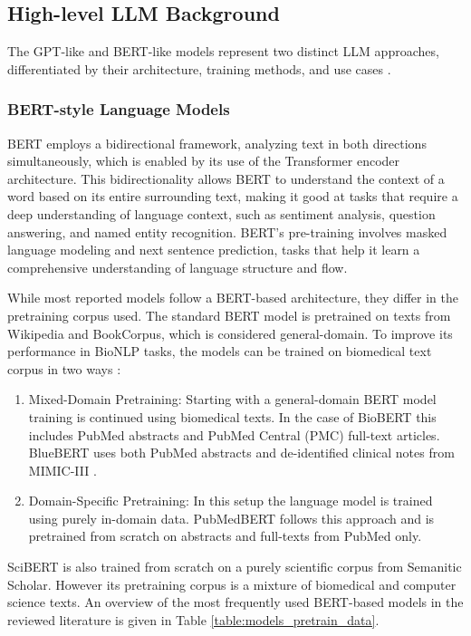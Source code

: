 \documentclass[fleqn,10pt]{olplainarticle}
\begin{document}
\subsection*{High-level LLM Background}
The GPT-like and BERT-like models represent two distinct LLM approaches, differentiated by their architecture, training methods, and use cases \citep{yang2023harnessing}. 

\subsubsection*{BERT-style Language Models}
BERT employs a bidirectional framework, analyzing text in both directions simultaneously, which is enabled by its use of the Transformer encoder architecture. This bidirectionality allows BERT to understand the context of a word based on its entire surrounding text, making it good at tasks that require a deep understanding of language context, such as sentiment analysis, question answering, and named entity recognition. BERT's pre-training involves masked language modeling and next sentence prediction, tasks that help it learn a comprehensive understanding of language structure and flow.

While most reported models follow a BERT-based architecture, they differ in the pretraining corpus used. The standard BERT \citep{devlin2018bert} model is pretrained on texts from Wikipedia and BookCorpus, which is considered general-domain. To improve its performance in BioNLP tasks, the models can be trained on biomedical text corpus in two ways \citep{gu2021domainPubMedBert}:
\begin{enumerate}
    \item Mixed-Domain Pretraining: Starting with a general-domain BERT model training is continued using biomedical texts. In the case of BioBERT \citep{lee2020biobert} this includes PubMed abstracts and PubMed Central (PMC) full-text articles. BlueBERT \citep{peng2019transferBLUE} uses both PubMed abstracts and de-identified clinical notes from MIMIC-III \citep{johnson2016mimic}.
    \item Domain-Specific Pretraining: In this setup the language model is trained using purely in-domain data. PubMedBERT \citep{gu2021domainPubMedBert} follows this approach and is pretrained from scratch on abstracts and full-texts from PubMed only. 
\end{enumerate}

SciBERT \citep{beltagy-etal-2019-scibert} is also trained from scratch on a purely scientific corpus from Semanitic Scholar. However its pretraining corpus is a mixture of biomedical and computer science texts. An overview of the most frequently used BERT-based models in the reviewed literature is given in Table \ref{table:models_pretrain_data}.
\end{document}
